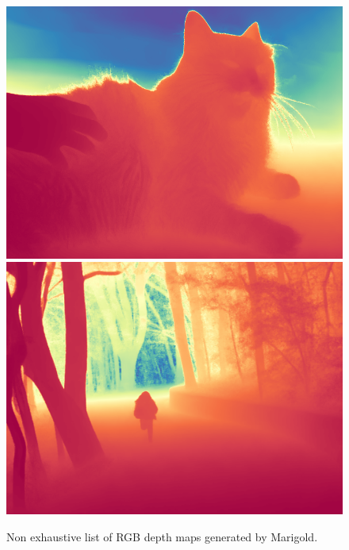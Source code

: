 \documentclass[12pt, letterpaper]{article}
\begin{document}
\begin{figure}[!ht]
\begin{minipage}{0.22\textwidth}
        \includegraphics[width=\textwidth]{example_5_pred_colored}
        \includegraphics[width=\textwidth]{example_7_pred_colored}
    \end{minipage}
    \caption{Non exhaustive list of RGB depth maps generated by Marigold.}
    \label{MRGfull}
\end{figure}
\end{document}
